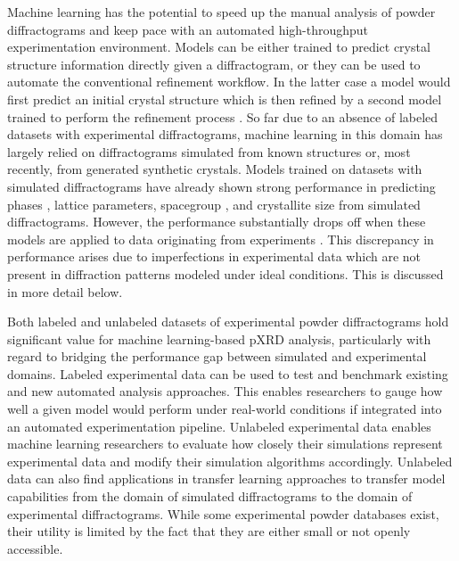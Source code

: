 Machine learning has the potential to speed up the manual analysis of powder diffractograms and keep pace with an automated high-throughput experimentation environment\cite{Agrawal2019, Surdu2023}.
Models can be either trained to predict crystal structure information directly given a diffractogram, or they can be used to automate the conventional refinement workflow. In the latter case a model would first predict an initial crystal structure \cite{Surdu2023} which is then refined by a second model trained to perform the refinement process \cite{Feng2019}. So far due to an absence of labeled datasets with experimental diffractograms\cite{Wang2020}, machine learning in this domain has largely relied on diffractograms simulated from known structures\cite{Park2017, Lee2023} or, most recently, from generated synthetic crystals\cite{Schopmans2023}. 
Models trained on datasets with simulated diffractograms have already shown strong performance in predicting phases \cite{Park2017,chenAutomatingCrystalstructurePhase2021, changProbabilisticPhaseLabeling2023}, lattice parameters\cite{Dong2021, Chitturi2021, Habershon2004, zhang2024crystallographic}, spacegroup \cite{cao2024simxrd, Schopmans2023, Oviedo2018, Park2017, Vecsei2018, Zaloga2020, Suzuki2020, Chakraborty2021,zhang2024crystallographic}, and crystallite size \cite{Dong2021, Chakraborty2021} from simulated diffractograms.
However, the performance substantially drops off when these models are applied to data originating from experiments \cite{cao2024simxrd, Schopmans2023,zhang2024crystallographic, Wang2020, Vecsei2018}. This discrepancy in performance arises due to imperfections in experimental data which are not present in diffraction patterns modeled under ideal conditions. This is discussed in more detail below.

Both labeled and unlabeled datasets of experimental powder diffractograms hold significant value for machine learning-based pXRD analysis, particularly with regard to bridging the performance gap between simulated and experimental domains. Labeled experimental data can be used to test and benchmark existing and new automated analysis approaches. This enables researchers to gauge how well a given model would perform under real-world conditions if integrated into an automated experimentation pipeline. Unlabeled experimental data enables machine learning researchers to evaluate how closely their simulations represent experimental data and modify their simulation algorithms accordingly. Unlabeled data can also find applications in transfer learning approaches to transfer model capabilities from the domain of simulated diffractograms to the domain of experimental diffractograms. While some experimental powder databases exist, their utility is limited by the fact that they are either small or not openly accessible.

